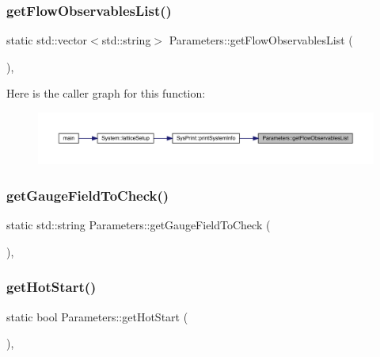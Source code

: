 \subsubsection{\texorpdfstring{getFlowObservablesList()}{getFlowObservablesList()}}
{\footnotesize\ttfamily static std\+::vector$<$std\+::string$>$ Parameters\+::get\+Flow\+Observables\+List (\begin{DoxyParamCaption}{ }\end{DoxyParamCaption})\hspace{0.3cm}{\ttfamily [inline]}, {\ttfamily [static]}}

Here is the caller graph for this function\+:\nopagebreak
\begin{figure}[H]
\begin{center}
\leavevmode
\includegraphics[width=350pt]{class_parameters_a7f1edc3384a46b6e4fc5e380a8fe6d41_icgraph}
\end{center}
\end{figure}
\mbox{\label{class_parameters_ad6dea2bb6e91a1ca4fb5e20216b40039}} 
\subsubsection{\texorpdfstring{getGaugeFieldToCheck()}{getGaugeFieldToCheck()}}
{\footnotesize\ttfamily static std\+::string Parameters\+::get\+Gauge\+Field\+To\+Check (\begin{DoxyParamCaption}{ }\end{DoxyParamCaption})\hspace{0.3cm}{\ttfamily [inline]}, {\ttfamily [static]}}

\mbox{\label{class_parameters_a5ba21c056f0b7da17abcdd0a1eb2061f}} 
\subsubsection{\texorpdfstring{getHotStart()}{getHotStart()}}
{\footnotesize\ttfamily static bool Parameters\+::get\+Hot\+Start (\begin{DoxyParamCaption}{ }\end{DoxyParamCaption})\hspace{0.3cm}{\ttfamily [inline]}, {\ttfamily [static]}}

